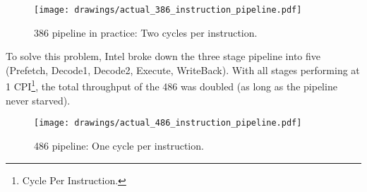 \begin{figure}[H]
\centering
\texttt{[image: drawings/actual\_386\_instruction\_pipeline.pdf]}
\caption{386 pipeline in practice: Two cycles per instruction.}
\label{386_real_pipeline}
\end{figure}

\par
To solve this problem, Intel broke down the three stage pipeline into five (Prefetch, Decode1, Decode2, Execute, WriteBack). With all stages performing at 1 CPI\footnote{Cycle Per Instruction.}, the total throughput of the 486 was doubled (as long as the pipeline never starved).\\
\par
\begin{figure}[H]
\centering
\texttt{[image: drawings/actual\_486\_instruction\_pipeline.pdf]}
\caption{486 pipeline: One cycle per instruction.}
\end{figure}
\par





